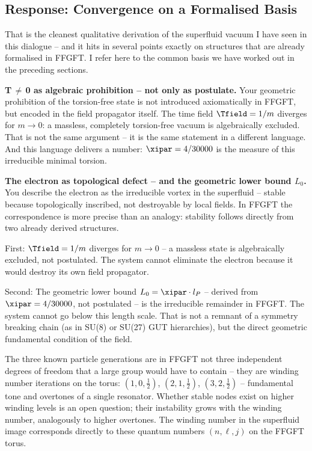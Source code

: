 \subsection{Response: Convergence on a Formalised Basis}

\begin{response}
That is the cleanest qualitative derivation of the superfluid vacuum I have seen in this dialogue -- and it hits in several points exactly on structures that are already formalised in FFGFT. I refer here to the common basis we have worked out in the preceding sections.

\medskip
\textbf{T\,$\neq$\,0 as algebraic prohibition -- not only as postulate.}
Your geometric prohibition of the torsion-free state is not introduced axiomatically in FFGFT, but encoded in the field propagator itself. The time field $\Tfield = 1/m$ diverges for $m \to 0$: a massless, completely torsion-free vacuum is algebraically excluded. That is not the same argument -- it is the same statement in a different language. And this language delivers a number: $\xipar = 4/30000$ is the measure of this irreducible minimal torsion.

\medskip
\textbf{The electron as topological defect -- and the geometric lower bound $L_0$.}
You describe the electron as the irreducible vortex in the superfluid -- stable because topologically inscribed, not destroyable by local fields. In FFGFT the correspondence is more precise than an analogy: stability follows directly from two already derived structures.

First: $\Tfield = 1/m$ diverges for $m \to 0$ -- a massless state is algebraically excluded, not postulated. The system cannot eliminate the electron because it would destroy its own field propagator.

Second: The geometric lower bound $L_0 = \xipar \cdot l_P$ -- derived from $\xipar = 4/30000$, not postulated -- is the irreducible remainder in FFGFT. The system cannot go below this length scale. That is not a remnant of a symmetry breaking chain (as in SU(8) or SU(27) GUT hierarchies), but the direct geometric fundamental condition of the field.

The three known particle generations are in FFGFT not three independent degrees of freedom that a large group would have to contain -- they are winding number iterations on the torus: $(1,0,\tfrac{1}{2})$, $(2,1,\tfrac{1}{2})$, $(3,2,\tfrac{1}{2})$ -- fundamental tone and overtones of a single resonator. Whether stable nodes exist on higher winding levels is an open question; their instability grows with the winding number, analogously to higher overtones. The winding number in the superfluid image corresponds directly to these quantum numbers $(n, \ell, j)$ on the FFGFT torus.


\end{response}
